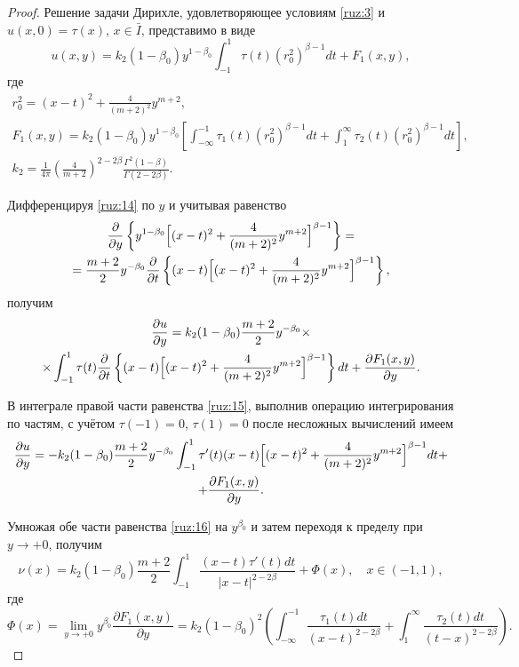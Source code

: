 \begin{proof} Решение задачи Дирихле, удовлетворяющее
условиям \eqref{ruz:3} и $u(x, 0)=\tau (x)$, $x\in\bar I$, представимо в виде
\begin{equation}
u(x,y)=k_2(1-\beta_0)y^{1-\beta_0}\int_{-1}^1{\tau(t)(r_0^2)^{\beta-1}}dt+F_1(x,y),
\label{ruz:14}
\end{equation}
где 
\begin{gather*}
r_0^2=(x-t)^2+\frac{4}{(m+2)^2}y^{m+2},
\\
F_1(x,y)=k_2(1-\beta_0)y^{1-\beta_0}\left[\int_{-\infty}^{-1}{\tau_1(t)(r_0^2)^{\beta-1}}dt+\int_1^\infty{\tau_2(t)(r_0^2)^{\beta-1}dt}\right],
\\
k_2=\frac{1}{4\pi}\left(\frac{4}{m+2}\right)^{2-2\beta}\frac{\Gamma^2(1-\beta)}{\Gamma(2-2\beta)}.
\end{gather*}

Дифференцируя \eqref{ruz:14} по $y$ и учитывая равенство
\begin{multline*}
\frac{\partial}{\partial y}\left\{y^{1-\beta_0}\Bigl[(x-t)^2+\frac{4}{(m+2)^2}y^{m+2}\Bigr]^{\beta-1}\right\}=
\\
=\frac{m+2}{2}y^{-\beta_0}\frac{\partial}{\partial t}\left\{(x-t)\Bigl[(x-t)^2+\frac{4}{(m+2)^2}y^{m+2}\Bigr]^{\beta-1}\right\},
\end{multline*}
получим
\begin{multline}
\frac{\partial u}{\partial y}=k_2(1-\beta_0)\frac{m+2}{2}y^{-\beta_0}\times
\\
\times\int_{-1}^1{\tau(t)\frac{\partial}{\partial t}\left\{(x-t)
\Bigl[(x-t)^2+\frac{4}{(m+2)^2}y^{m+2}\Bigr]^{\beta-1}\right\}dt}+
\frac{\partial F_1(x,y)}{\partial y}.
\label{ruz:15}
\end{multline}

В интеграле правой части  равенства \eqref{ruz:15}, выполнив операцию интегрирования по частям,
с учётом $\tau(-1)=0$,  $\tau(1)=0$ после несложных вычислений имеем 
\begin{multline}
\frac{\partial u}{\partial y}=-k_2(1-\beta_0)\frac{m+2}{2}y^{-\beta_0}\int_{-1}^1{\tau'(t)(x-t)\Bigl[(x-t)^2+\frac{4}{(m+2)^2}y^{m+2}\Bigr]^{\beta-1}}dt+
\\
+\frac{\partial F_1(x,y)}{\partial y}.
\label{ruz:16}
\end{multline}

Умножая обе части равенства \eqref{ruz:16}  на  $y^{\beta_0}$ и затем  переходя к пределу при $y\to+0$, получим
\begin{equation}
\nu(x)=k_2(1-\beta_0)\frac{m+2}{2}\int_{-1}^1{\frac{(x-t)\tau'(t)dt}{|x-t|^{2-2\beta}}}+\Phi(x), \quad x\in(-1, 1),
\label{ruz:17}
\end{equation}
где
$$\Phi(x)=\lim\limits_{y\to+0}y^{\beta_0}\frac{\partial F_1(x,y)}{\partial y}=k_2(1-\beta_0)^2\left(\int_{-\infty}^{-1}{\frac{\tau_1(t)dt}{(x-t)^{2-2\beta}}}+\int_1^\infty{\frac{\tau_2(t)dt}{(t-x)^{2-2\beta}}}\right).$$


\end{proof}
